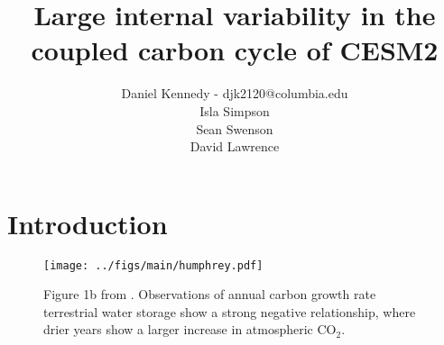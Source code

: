 \documentclass[11pt]{article}
\title{Large internal variability in the coupled carbon cycle of CESM2 \large \\}
\author{Daniel Kennedy - djk2120@columbia.edu \\ Isla Simpson \\ Sean Swenson
\\ David Lawrence}
\begin{document}
\maketitle

\section{Introduction}

\begin{figure}[h]
\centering
\texttt{[image: ../figs/main/humphrey.pdf]}
\caption{Figure 1b from \cite{humphrey2018}. Observations of annual carbon growth rate terrestrial water storage show a strong negative relationship, where drier years show a larger increase in atmospheric CO$_2$.}
\label{fig:humphrey}
\end{figure}


\nocite{*}

\end{document}
